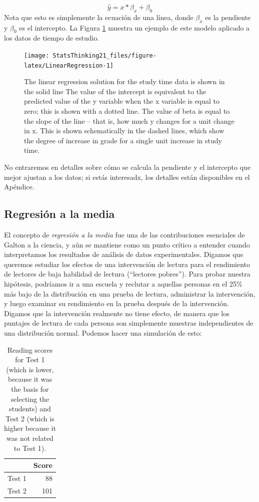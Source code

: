 \documentclass[
  12pt,
]{book}
\begin{document}
\[
\hat{y} = x * \beta_x + \beta_0 
\]
Nota que esto es simplemente la ecuación de una línea, donde \(\beta_x\) es la pendiente y \(\beta_0\) es el intercepto. La Figura \ref{fig:LinearRegression} muestra un ejemplo de este modelo aplicado a los datos de tiempo de estudio.

\begin{figure}
\texttt{[image: StatsThinking21\_files/figure-latex/LinearRegression-1]} \caption{The linear regression solution for the study time data is shown in the solid line The value of the intercept is equivalent to the predicted value of the y variable when the x variable is equal to zero; this is shown with a dotted line.  The value of beta is equal to the slope of the line -- that is, how much y changes for a unit change in x.  This is shown schematically in the dashed lines, which show the degree of increase in grade for a single unit increase in study time.}\label{fig:LinearRegression}
\end{figure}

No entraremos en detalles sobre cómo se calcula la pendiente y el intercepto que mejor ajustan a los datos; si estás interesadx, los detalles están disponibles en el Apéndice.

\hypertarget{regression-to-the-mean}{%
\subsection{Regresión a la media}\label{regression-to-the-mean}}

El concepto de \emph{regresión a la media} fue una de las contribuciones esenciales de Galton a la ciencia, y aún se mantiene como un punto crítico a entender cuando interpretamos los resultados de análisis de datos experimentales. Digamos que queremos estudiar los efectos de una intervención de lectura para el rendimiento de lectores de baja habilidad de lectura (``lectores pobres''). Para probar nuestra hipótesis, podríamos ir a una escuela y reclutar a aquellas personas en el 25\% más bajo de la distribución en una prueba de lectura, administrar la intervención, y luego examinar su rendimiento en la prueba después de la intervención. Digamos que la intervención realmente no tiene efecto, de manera que los puntajes de lectura de cada persona son simplemente muestras independientes de una distribución normal. Podemos hacer una simulación de esto:

\begin{table}

\caption{\label{tab:unnamed-chunk-98}Reading scores for Test 1 (which is lower, because it was the basis for selecting the students) and Test 2 (which is higher because it was not related to Test 1).}
\centering
\begin{tabular}[t]{l|r}
\hline
  & Score\\
\hline
Test 1 & 88\\
\hline
Test 2 & 101\\
\hline
\end{tabular}
\end{table}
\end{document}
